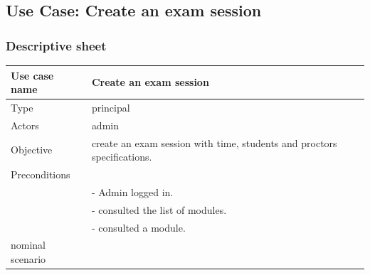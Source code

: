 \documentclass[]{uc2pfecaneva}
\begin{document}
\begin{table}[t]
	\raggedright\subsection{Use Case: Create an exam session}
	\subsubsection{Descriptive sheet}
	\centering
	\begin{tabularx}{\textwidth}{|l|X|}
		\hline
		Use case name         & Create an exam session                                                                                                                                            \\ \hline
		Type                  & principal                                                                                                                                                         \\ \hline
		Actors                & admin                                                                                                                                                             \\ \hline
		Objective             & create an exam session with time, students and proctors specifications.                                                                                           \\ \hline
		Preconditions         &                                                                                                                                                                   \\
		& - Admin logged in.                                                                                                                                                \\
		& - consulted the list of modules.                                                                                                                                  \\
		& - consulted a module.                                                                                                                                             \\ \hline
		nominal scenario      &                                                                                                                                                                   \\

\end{tabularx}
\end{table}
\end{document}
